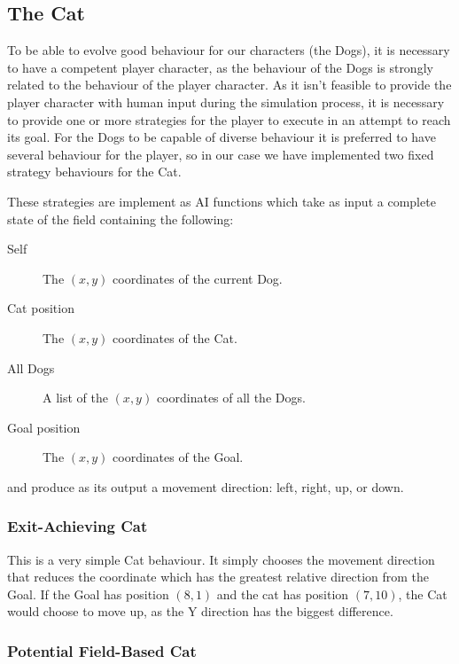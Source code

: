 \subsection{The Cat}
\label{sec:cat}

To be able to evolve good behaviour for our characters (the Dogs), it is
necessary to have a competent player character, as the behaviour of the Dogs is
strongly related to the behaviour of the player character. As it isn't feasible
to provide the player character with human input during the simulation process,
it is necessary to provide one or more strategies for the player to execute in
an attempt to reach its goal. For the Dogs to be capable of diverse behaviour it
is preferred to have several behaviour for the player, so in our case we have
implemented two fixed strategy behaviours for the Cat.

These strategies are implement as AI functions which take as input a complete
state of the field containing the following:
\begin{description}
\item[Self] The \((x,y)\) coordinates of the current Dog.
\item[Cat position] The \((x,y)\) coordinates of the Cat.
\item[All Dogs] A list of the \((x,y)\) coordinates of all the Dogs.
\item[Goal position] The \((x,y)\) coordinates of the Goal.
\end{description}

and produce as its output a movement direction: left, right, up, or down.

\subsubsection{Exit-Achieving Cat}
\label{sec:exit-achieving-cat}

This is a very simple Cat behaviour. It simply chooses the movement direction
that reduces the coordinate which has the greatest relative direction from the
Goal. If the Goal has position \((8,1)\) and the cat has position \((7,10)\),
the Cat would choose to move up, as the Y direction has the biggest difference.

\subsubsection{Potential Field-Based Cat}
\label{sec:potent-field-based}

